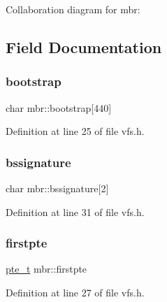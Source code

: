 Collaboration diagram for mbr\+:


\subsection{Field Documentation}
\mbox{\label{a00316_acd9201425a84fdd1d341c2d529494ab1_acd9201425a84fdd1d341c2d529494ab1}} 
\subsubsection{\texorpdfstring{bootstrap}{bootstrap}}
{\footnotesize\ttfamily char mbr\+::bootstrap\mbox{[}440\mbox{]}}



Definition at line 25 of file vfs.\+h.

\mbox{\label{a00316_a586361d132b342e9628f1079ad7b4b8d_a586361d132b342e9628f1079ad7b4b8d}} 
\subsubsection{\texorpdfstring{bssignature}{bssignature}}
{\footnotesize\ttfamily char mbr\+::bssignature\mbox{[}2\mbox{]}}



Definition at line 31 of file vfs.\+h.

\mbox{\label{a00316_abd208d0cb66e336d565beb33de1b5056_abd208d0cb66e336d565beb33de1b5056}} 
\subsubsection{\texorpdfstring{firstpte}{firstpte}}
{\footnotesize\ttfamily \hyperlink{a00191_aeef6bb6b6bbfd4d912338e1e5c6938a5_aeef6bb6b6bbfd4d912338e1e5c6938a5}{pte\+\_\+t} mbr\+::firstpte}



Definition at line 27 of file vfs.\+h.

\mbox{\label{a00316_ace1c3d3ab069c2620bc27f49168f1e6b_ace1c3d3ab069c2620bc27f49168f1e6b}} 
